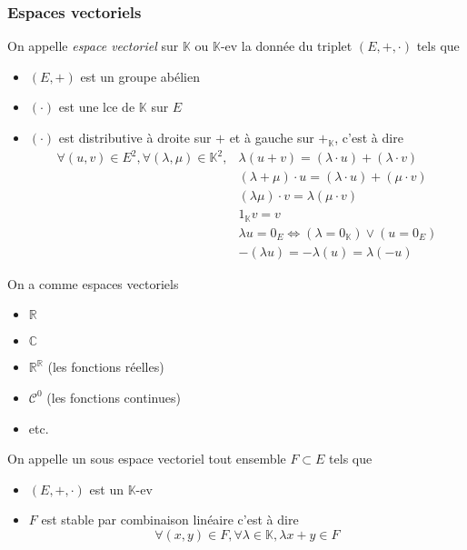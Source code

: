 \documentclass[11pt,colorlinks]{book}
\theoremstyle{mytheoremstyle}
\theoremstyle{mytheoremstyle}
\theoremstyle{mytheoremstyle}
\theoremstyle{mytheoremstyle}
\theoremstyle{mytheoremstyle}
\theoremstyle{mytheoremstyle}
\theoremstyle{mytheoremstyle}
\theoremstyle{mytheoremstyle}
\theoremstyle{myproblemstyle}
\def\mbb#1{\mathbb{#1}}
\def\mfc#1{\mathcal{#1}}
\def\bC{\mbb{C}}
\def\bR{\mbb{R}}
\def\bK{\mbb{K}}
\begin{document}
\subsubsection{Espaces vectoriels}
\begin{definition}
  On appelle \textit{espace vectoriel} sur $\bK$ ou $\bK$-ev la donnée du triplet $(E,+,\cdot)$ tels que 
  \begin{itemize}
    \item $(E,+)$ est un groupe abélien
    \item $(\cdot)$ est une lce de $\bK$ sur $E$ 
    \item $(\cdot)$ est distributive à droite sur $+$ et à gauche sur $+_{\bK}$, c'est à dire 
    \begin{align*}
      \forall (u,v) \in E^2, \forall (\lambda,\mu) \in \bK^2, &\lambda(u+v) = (\lambda \cdot u) + (\lambda \cdot v) \\ 
      &(\lambda + \mu) \cdot u = (\lambda \cdot u) + (\mu \cdot v) \\ 
      &(\lambda \mu) \cdot v = \lambda (\mu \cdot v) \\ 
      &1_{\bK} v = v \\
      &\lambda u = 0_E \Leftrightarrow (\lambda = 0_{\bK}) \vee (u = 0_E) \\ 
      &- (\lambda u) = -\lambda (u) = \lambda (-u)
    \end{align*}
  \end{itemize}
\end{definition}
\begin{rmq}
  On a comme espaces vectoriels 
  \begin{itemize}
    \item $\bR$
    \item $\bC$
    \item $\bR^{\bR}$ (les fonctions réelles)
    \item $\mfc{C}^0$ (les fonctions continues)
    \item etc.
  \end{itemize}
\end{rmq}
\begin{definition}
  On appelle un sous espace vectoriel tout ensemble $F \subset E$ tels que 
  \begin{itemize}
    \item $(E,+,\cdot)$ est un $\bK$-ev
    \item $F$ est stable par combinaison linéaire c'est à dire
    \begin{equation*}
      \forall (x,y) \in F, \forall \lambda \in \bK, \lambda x + y \in F
    \end{equation*}
  \end{itemize}
\end{definition}
\end{document}
